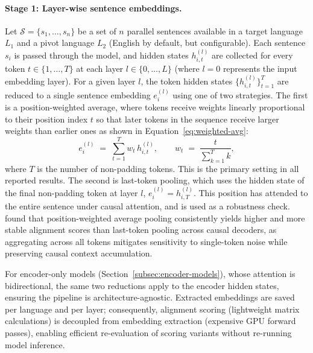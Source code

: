 \paragraph{Stage 1: Layer-wise sentence embeddings.}
Let $\mathcal{S} = \{s_1, \dots, s_n\}$ be a set of $n$ parallel sentences available in a target language $L_1$ and a pivot language $L_2$ (English by default, but configurable). Each sentence $s_i$ is passed through the model, and hidden states $h_{i,t}^{(l)}$ are collected for every token $t \in \{1, \dots, T\}$ at each layer $l \in \{0, \dots, L\}$ (where $l=0$ represents the input embedding layer). For a given layer $l$, the token hidden states $\{h_{i,t}^{(l)}\}_{t=1}^T$ are reduced to a single sentence embedding $e_i^{(l)}$ using one of two strategies. The first is a position-weighted average, where tokens receive weights linearly proportional to their position index $t$ so that later tokens in the sequence receive larger weights than earlier ones as shown in Equation~\eqref{eq:weighted-avg}:
\begin{equation}
    e_i^{(l)} \;=\; \sum_{t=1}^{T} w_t\, h_{i,t}^{(l)},
    \qquad
    w_t \;=\; \frac{t}{\sum_{k=1}^{T} k},
    \label{eq:weighted-avg}
\end{equation}
where $T$ is the number of non-padding tokens. This is the primary setting in all reported results. The second is last-token pooling, which uses the hidden state of the final non-padding token at layer $l$, $e_i^{(l)} = h_{i,T}^{(l)}$. This position has attended to the entire sentence under causal attention, and is used as a robustness check. \citet{kargaran2025mexa} found that position-weighted average pooling consistently yields higher and more stable alignment scores than last-token pooling across causal decoders, as aggregating across all tokens mitigates sensitivity to single-token noise while preserving causal context accumulation.

For encoder-only models (Section~\ref{subsec:encoder-models}), whose attention is bidirectional, the same two reductions apply to the encoder hidden states, ensuring the pipeline is architecture-agnostic. Extracted embeddings are saved per language and per layer; consequently, alignment scoring (lightweight matrix calculations) is decoupled from embedding extraction (expensive GPU forward passes), enabling efficient re-evaluation of scoring variants without re-running model inference.

